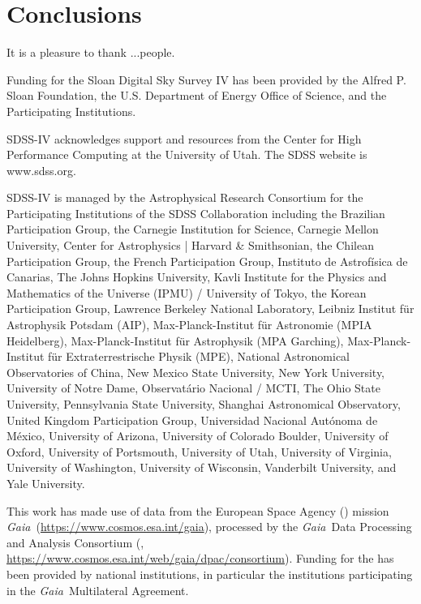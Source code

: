 \documentclass[modern]{aastex63}
\newcommand{\gaia}{\textsl{Gaia}}
\begin{document}
\section{Conclusions}
\label{sec:conclusions}



\acknowledgments
It is a pleasure to thank
  ...people.

Funding for the Sloan Digital Sky
Survey IV has been provided by the
Alfred P. Sloan Foundation, the U.S.
Department of Energy Office of
Science, and the Participating
Institutions.

SDSS-IV acknowledges support and
resources from the Center for High
Performance Computing  at the
University of Utah. The SDSS
website is www.sdss.org.

SDSS-IV is managed by the
Astrophysical Research Consortium
for the Participating Institutions
of the SDSS Collaboration including
the Brazilian Participation Group,
the Carnegie Institution for Science,
Carnegie Mellon University, Center for
Astrophysics | Harvard \&
Smithsonian, the Chilean Participation
Group, the French Participation Group,
Instituto de Astrof\'isica de
Canarias, The Johns Hopkins
University, Kavli Institute for the
Physics and Mathematics of the
Universe (IPMU) / University of
Tokyo, the Korean Participation Group,
Lawrence Berkeley National Laboratory,
Leibniz Institut f\"ur Astrophysik
Potsdam (AIP),  Max-Planck-Institut
f\"ur Astronomie (MPIA Heidelberg),
Max-Planck-Institut f\"ur
Astrophysik (MPA Garching),
Max-Planck-Institut f\"ur
Extraterrestrische Physik (MPE),
National Astronomical Observatories of
China, New Mexico State University,
New York University, University of
Notre Dame, Observat\'ario
Nacional / MCTI, The Ohio State
University, Pennsylvania State
University, Shanghai
Astronomical Observatory, United
Kingdom Participation Group,
Universidad Nacional Aut\'onoma
de M\'exico, University of Arizona,
University of Colorado Boulder,
University of Oxford, University of
Portsmouth, University of Utah,
University of Virginia, University
of Washington, University of
Wisconsin, Vanderbilt University,
and Yale University.

This work has made use of data from the European Space Agency ()
mission \gaia\ (\url{https://www.cosmos.esa.int/gaia}), processed by the \gaia\
Data Processing and Analysis Consortium (,
\url{https://www.cosmos.esa.int/web/gaia/dpac/consortium}). Funding for the
\acronym{DPAC}
has been provided by national institutions, in particular the institutions
participating in the \gaia\ Multilateral Agreement.
\end{document}
